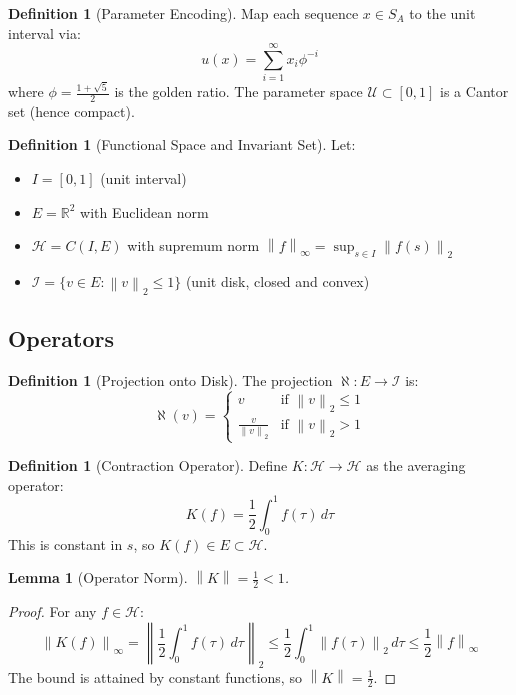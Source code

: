 \documentclass[11pt,a4paper]{article}
\theoremstyle{plain}
\newtheorem{lemma}[theorem]{Lemma}
\theoremstyle{definition}
\newtheorem{definition}[theorem]{Definition}
\newcommand{\Hilb}{\mathcal{H}}
\newcommand{\I}{\mathcal{I}}
\newcommand{\U}{\mathcal{U}}
\newcommand{\norm}[1]{\left\lVert #1 \right\rVert}
\begin{document}
\begin{definition}[Parameter Encoding]
Map each sequence $x \in S_A$ to the unit interval via:
\[
u(x) = \sum_{i=1}^{\infty} x_i \phi^{-i}
\]
where $\phi = \frac{1 + \sqrt{5}}{2}$ is the golden ratio. The parameter space $\U \subset [0, 1]$ is a Cantor set (hence compact).
\end{definition}

\begin{definition}[Functional Space and Invariant Set]
Let:
\begin{itemize}
    \item $I = [0, 1]$ (unit interval)
    \item $E = \mathbb{R}^2$ with Euclidean norm
    \item $\Hilb = C(I, E)$ with supremum norm $\norm{f}_\infty = \sup_{s \in I} \norm{f(s)}_2$
    \item $\I = \{v \in E : \norm{v}_2 \leq 1\}$ (unit disk, closed and convex)
\end{itemize}
\end{definition}

\subsection{Operators}

\begin{definition}[Projection onto Disk]
The projection $\aleph: E \to \I$ is:
\[
\aleph(v) = \begin{cases}
v & \text{if } \norm{v}_2 \leq 1 \\
\frac{v}{\norm{v}_2} & \text{if } \norm{v}_2 > 1
\end{cases}
\]
\end{definition}

\begin{definition}[Contraction Operator]
Define $K: \Hilb \to \Hilb$ as the averaging operator:
\[
K(f) = \frac{1}{2} \int_0^1 f(\tau) \, d\tau
\]
This is constant in $s$, so $K(f) \in E \subset \Hilb$.
\end{definition}

\begin{lemma}[Operator Norm]
$\norm{K} = \frac{1}{2} < 1$.
\end{lemma}

\begin{proof}
For any $f \in \Hilb$:
\[
\norm{K(f)}_\infty = \left\| \frac{1}{2} \int_0^1 f(\tau) \, d\tau \right\|_2 \leq \frac{1}{2} \int_0^1 \norm{f(\tau)}_2 \, d\tau \leq \frac{1}{2} \norm{f}_\infty
\]
The bound is attained by constant functions, so $\norm{K} = \frac{1}{2}$.
\end{proof}
\end{document}
